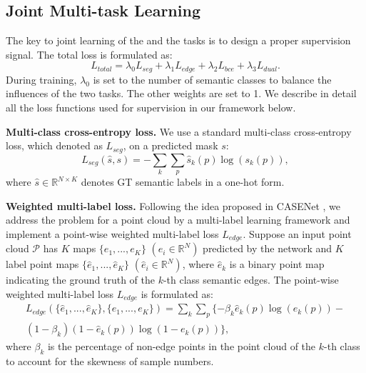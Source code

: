 \documentclass[runningheads]{llncs}
\begin{document}
 
\subsection{Joint Multi-task Learning} \label{Joint multi-task learning}

The key to joint learning of the {\SemSeg} and the {\SemEdgeD} tasks is {to design} a proper supervision signal. The total loss is formulated as:
    \begin{equation}
        L_{total} = \lambda_0 L_{seg} + \lambda_1 L_{edge} + \lambda_2 L_{bce} + \lambda_3 L_{dual}.
        \label{eqn1}
    \end{equation}
During training, $\lambda_0$ is set to the number of semantic classes to balance the influences of the two tasks. The other weights are set to 1.
We describe in detail all the loss functions used for supervision in our framework below. 


\smallskip \noindent \textbf{Multi-class cross-entropy loss.}
We use {a} standard multi-class cross-entropy loss, which denoted as $L_{seg}$, on {a} predicted {\SemSegPoint} mask $s$:
    \begin{equation}
        L_{seg}(\hat{s}, s) = -\sum_k\sum_p\hat{s}_k(p)\log(s_k(p)),
        \label{eqn2}
    \end{equation}
where $\hat{s} \in \mathbb{R}^{N \times K}$ denotes GT semantic labels in {a} one-hot form. 


\smallskip \noindent \textbf{Weighted multi-label loss.}
Following the idea proposed in CASENet \cite{yu2017casenet}, we address the {\SemEdgeD} problem {for a point cloud}
by a multi-label learning framework and implement a point-wise weighted multi-label loss $L_{edge}$. Suppose an input point cloud $\mathcal{P}$ has $K$ {\SemEdgePoint} maps $\{e_1,...,e_K\}$ $(e_i \in \mathbb{R}^{N})$ predicted by the network and $K$ label point maps $\{\hat{e}_1,...,\hat{e}_K\}$ $(\hat{e}_i \in \mathbb{R}^{N})$, where $\hat{e}_k$ is a binary point map indicating the ground truth of the $k$-th class semantic edges. The point-wise weighted multi-label loss $L_{edge}$ is formulated as:
    \begin{multline}
         L_{edge}(\{\hat{e}_1,...,\hat{e}_K\},  \{e_1,...,e_K\}) = \sum_k\sum_p\{-\beta_k \hat{e}_k(p)\log(e_k(p)) -\\ 
        (1 - \beta_k)(1 - \hat{e}_k(p))\log(1 - e_k(p))\},
        \label{eqn3}
    \end{multline}
where $\beta_k$ is the percentage of non-edge points in the point cloud of the $k$-th class to account for {the} skewness of sample numbers.
\end{document}
